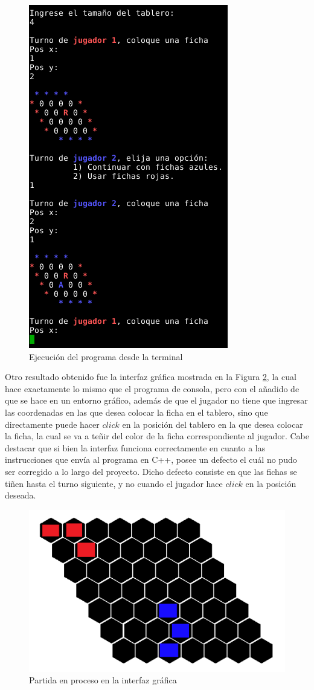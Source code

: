 \documentclass[12pt,letterpaper]{article}
\begin{document}
\begin{figure}[H]
\centering
\includegraphics[width=0.5\columnwidth]{main.png}
\caption{Ejecución del programa desde la terminal}
\label{fig:main_1}
\end{figure}

Otro resultado obtenido fue la interfaz gráfica mostrada en la Figura \ref{fig:ig}, la cual hace exactamente lo mismo que el programa de consola, pero con el añadido de que se hace en un entorno gráfico, además de que el jugador no tiene que ingresar las coordenadas en las que desea colocar la ficha en el tablero, sino que directamente puede hacer $click$ en la posición del tablero en la que desea colocar la ficha, la cual se va a teñir del color de la ficha correspondiente al jugador. Cabe destacar que si bien la interfaz funciona correctamente en cuanto a las instrucciones que envía al programa en C++, posee un defecto el cuál no pudo ser corregido a lo largo del proyecto. Dicho defecto consiste en que las fichas se tiñen hasta el turno siguiente, y no cuando el jugador hace $click$ en la posición deseada. 

\begin{figure}[H]
\centering
\includegraphics[width=0.6\columnwidth]{ig.png}
\caption{Partida en proceso en la interfaz gráfica}
\label{fig:ig}
\end{figure}
\end{document}
